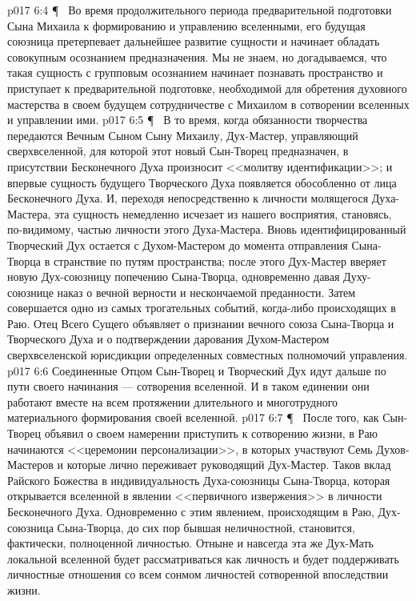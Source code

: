 \vs p017 6:4 \P\ \bibnobreakspace {} Во время продолжительного периода предварительной подготовки Сына Михаила к формированию и управлению вселенными, его будущая союзница претерпевает дальнейшее развитие сущности и начинает обладать совокупным осознанием предназначения. Мы не знаем, но догадываемся, что такая сущность с групповым осознанием начинает познавать пространство и приступает к предварительной подготовке, необходимой для обретения духовного мастерства в своем будущем сотрудничестве с Михаилом в сотворении вселенных и управлении ими.
\vs p017 6:5 \P\ \bibnobreakspace {} В то время, когда обязанности творчества передаются Вечным Сыном Сыну Михаилу, Дух\hyp{}Мастер, управляющий сверхвселенной, для которой этот новый Сын\hyp{}Творец предназначен, в присутствии Бесконечного Духа произносит <<молитву идентификации>>; и впервые сущность будущего Творческого Духа появляется обособленно от лица Бесконечного Духа. И, переходя непосредственно к личности молящегося Духа\hyp{}Мастера, эта сущность немедленно исчезает из нашего восприятия, становясь, по\hyp{}видимому, частью личности этого Духа\hyp{}Мастера. Вновь идентифицированный Творческий Дух остается с Духом\hyp{}Мастером до момента отправления Сына\hyp{}Творца в странствие по путям пространства; после этого Дух\hyp{}Мастер вверяет новую Дух\hyp{}союзницу попечению Сына\hyp{}Творца, одновременно давая Духу\hyp{}союзнице наказ о вечной верности и нескончаемой преданности. Затем совершается одно из самых трогательных событий, когда\hyp{}либо происходящих в Раю. Отец Всего Сущего объявляет о признании вечного союза Сына\hyp{}Творца и Творческого Духа и о подтверждении дарования Духом\hyp{}Мастером сверхвселенской юрисдикции определенных совместных полномочий управления.
\vs p017 6:6 Соединенные Отцом Сын\hyp{}Творец и Творческий Дух идут дальше по пути своего начинания --- сотворения вселенной. И в таком единении они работают вместе на всем протяжении длительного и многотрудного материального формирования своей вселенной.
\vs p017 6:7 \P\ \bibnobreakspace {} После того, как Сын\hyp{}Творец объявил о своем намерении приступить к сотворению жизни, в Раю начинаются <<церемонии персонализации>>, в которых участвуют Семь Духов\hyp{}Мастеров и которые лично переживает руководящий Дух\hyp{}Мастер. Таков вклад Райского Божества в индивидуальность Духа\hyp{}союзницы Сына\hyp{}Творца, которая открывается вселенной в явлении <<первичного извержения>> в личности Бесконечного Духа. Одновременно с этим явлением, происходящим в Раю, Дух\hyp{}союзница Сына\hyp{}Творца, до сих пор бывшая неличностной, становится, фактически, полноценной личностью. Отныне и навсегда эта же Дух\hyp{}Мать локальной вселенной будет рассматриваться как личность и будет поддерживать личностные отношения со всем сонмом личностей сотворенной впоследствии жизни.
